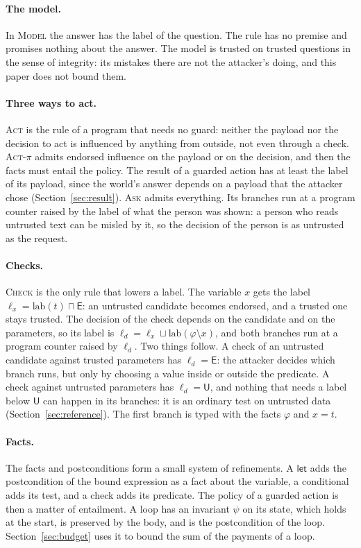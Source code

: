 \documentclass[acmsmall,nonacm,screen]{acmart}
\newcommand{\kw}[1]{\mathsf{#1}}
\newcommand{\E}{\kw{E}}
\newcommand{\U}{\kw{U}}
\newcommand{\lab}{\mathrm{lab}}
\begin{document}
\paragraph{The model.} In \textsc{Model} the answer has the label of the question. The rule
has no premise and promises nothing about the answer. The model is trusted on trusted
questions in the sense of integrity: its mistakes there are not the attacker's doing, and
this paper does not bound them.

\paragraph{Three ways to act.} \textsc{Act} is the rule of a program that needs no guard:
neither the payload nor the decision to act is influenced by anything from outside, not even
through a check. \textsc{Act-$\pi$} admits endorsed influence on the payload or on the
decision, and then the facts must entail the policy. The result of a guarded action has at
least the label of its payload, since the world's answer depends on a payload that the
attacker chose (Section~\ref{sec:result}). \textsc{Ask} admits everything. Its branches run at
a program counter raised by the label of what the person was shown: a person who reads
untrusted text can be misled by it, so the decision of the person is as untrusted as the
request.

\paragraph{Checks.} \textsc{Check} is the only rule that lowers a label. The variable $x$
gets the label $\ell_x = \lab(t) \sqcap \E$: an untrusted candidate becomes endorsed, and a
trusted one stays trusted. The decision of the check depends on the candidate and on the
parameters, so its label is $\ell_d = \ell_x \sqcup \lab(\varphi \setminus x)$, and both
branches run at a program counter raised by $\ell_d$. Two things follow. A check of an
untrusted candidate against trusted parameters has $\ell_d = \E$: the attacker decides which
branch runs, but only by choosing a value inside or outside the predicate. A check against
untrusted parameters has $\ell_d = \U$, and nothing that needs a label below $\U$ can happen
in its branches: it is an ordinary test on untrusted data (Section~\ref{sec:reference}). The
first branch is typed with the facts $\varphi$ and $x = t$.

\paragraph{Facts.} The facts and postconditions form a small system of refinements. A
$\kw{let}$ adds the postcondition of the bound expression as a fact about the variable, a
conditional adds its test, and a check adds its predicate. The policy of a guarded action is
then a matter of entailment. A loop has an invariant $\psi$ on its state, which holds at the
start, is preserved by the body, and is the postcondition of the loop.
Section~\ref{sec:budget} uses it to bound the sum of the payments of a loop.
\end{document}
